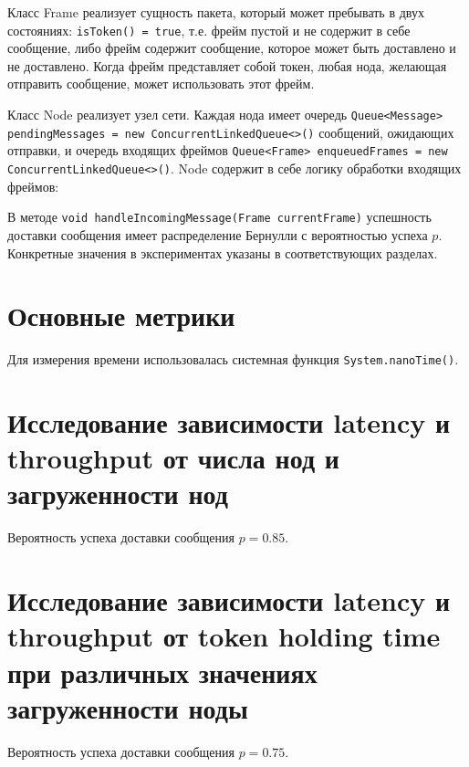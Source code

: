 \documentclass{article}
\begin{document}
Класс Frame реализует сущность пакета, который может пребывать в двух состояниях: \lstinline|isToken() = true|, т.е. фрейм пустой и не содержит в себе сообщение, либо фрейм содержит сообщение, которое может быть доставлено и не доставлено. Когда фрейм представляет собой токен, любая нода, желающая отправить сообщение, может использовать этот фрейм.

Класс Node реализует узел сети. Каждая нода имеет очередь \lstinline|Queue<Message> pendingMessages = new ConcurrentLinkedQueue<>()| сообщений, ожидающих отправки, и очередь входящих фреймов \lstinline|Queue<Frame> enqueuedFrames = new ConcurrentLinkedQueue<>()|. Node содержит в себе логику обработки входящих фреймов:



В методе \lstinline|void handleIncomingMessage(Frame currentFrame)| успешность доставки сообщения имеет распределение Бернулли с вероятностью успеха $p$. Конкретные значения в экспериментах указаны в соответствующих разделах.



\section{Основные метрики}
Для измерения времени использовалась системная функция \lstinline|System.nanoTime()|.


\section{Исследование зависимости latency и throughput от числа нод и загруженности нод}

Вероятность успеха доставки сообщения $p=0.85$.

\section{Исследование зависимости latency и throughput от token holding time при различных значениях загруженности ноды}

Вероятность успеха доставки сообщения $p=0.75$.

\newpage
% 

% 

% 

% 

% 


\end{document}
